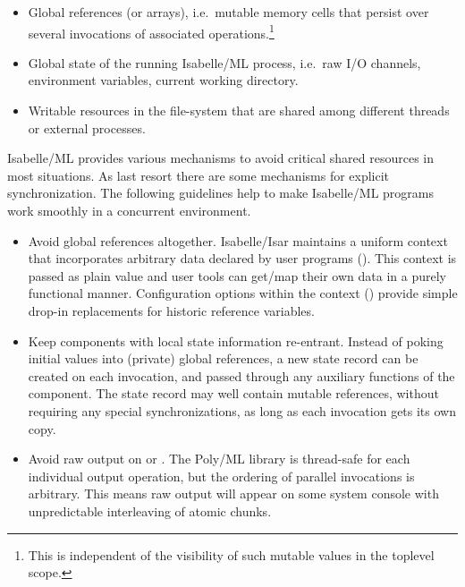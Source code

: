 \begin{isabellebody}
\begin{isamarkuptext}
  \begin{itemize}

  \item Global references (or arrays), i.e.\ mutable memory cells that
  persist over several invocations of associated
  operations.\footnote{This is independent of the visibility of such
  mutable values in the toplevel scope.}

  \item Global state of the running Isabelle/ML process, i.e.\ raw I/O
  channels, environment variables, current working directory.

  \item Writable resources in the file-system that are shared among
  different threads or external processes.

  \end{itemize}

  Isabelle/ML provides various mechanisms to avoid critical shared
  resources in most situations.  As last resort there are some
  mechanisms for explicit synchronization.  The following guidelines
  help to make Isabelle/ML programs work smoothly in a concurrent
  environment.

  \begin{itemize}

  \item Avoid global references altogether.  Isabelle/Isar maintains a
  uniform context that incorporates arbitrary data declared by user
  programs ().  This context is passed as
  plain value and user tools can get/map their own data in a purely
  functional manner.  Configuration options within the context
  () provide simple drop-in replacements
  for historic reference variables.

  \item Keep components with local state information re-entrant.
  Instead of poking initial values into (private) global references, a
  new state record can be created on each invocation, and passed
  through any auxiliary functions of the component.  The state record
  may well contain mutable references, without requiring any special
  synchronizations, as long as each invocation gets its own copy.

  \item Avoid raw output on  or .  The
  Poly/ML library is thread-safe for each individual output operation,
  but the ordering of parallel invocations is arbitrary.  This means
  raw output will appear on some system console with unpredictable
  interleaving of atomic chunks.


\end{itemize}
\end{isamarkuptext}
\end{isabellebody}

